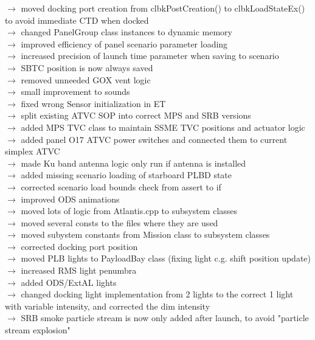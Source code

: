 \documentclass[Space_Shuttle_Vessel_Manual.tex]{subfiles}
\begin{document}
$\rightarrow$ moved docking port creation from clbkPostCreation() to clbkLoadStateEx() to avoid immediate CTD when docked\\
$\rightarrow$ changed PanelGroup class instances to dynamic memory\\
$\rightarrow$ improved efficiency of panel scenario parameter loading\\
$\rightarrow$ increased precision of launch time parameter when saving to scenario\\
$\rightarrow$ SBTC position is now always saved\\
$\rightarrow$ removed unneeded GOX vent logic\\
$\rightarrow$ small improvement to sounds\\
$\rightarrow$ fixed wrong Sensor initialization in ET\\
$\rightarrow$ split existing ATVC SOP into correct MPS and SRB versions\\
$\rightarrow$ added MPS TVC class to maintain SSME TVC positions and actuator logic\\
$\rightarrow$ added panel O17 ATVC power switches and connected them to current simplex ATVC\\
$\rightarrow$ made Ku band antenna logic only run if antenna is installed\\
$\rightarrow$ added missing scenario loading of starboard PLBD state\\
$\rightarrow$ corrected scenario load bounds check from assert to if\\
$\rightarrow$ improved ODS animations\\
$\rightarrow$ moved lots of logic from Atlantis.cpp to subsystem classes\\
$\rightarrow$ moved several consts to the files where they are used\\
$\rightarrow$ moved subystem constants from Mission class to subsystem classes\\
$\rightarrow$ corrected docking port position\\
$\rightarrow$ moved PLB lights to PayloadBay class (fixing light c.g. shift position update)\\
$\rightarrow$ increased RMS light penumbra\\
$\rightarrow$ added ODS/ExtAL lights\\
$\rightarrow$ changed docking light implementation from 2 lights to the correct 1 light with variable intensity, and corrected the dim intensity\\
$\rightarrow$ SRB smoke particle stream is now only added after launch, to avoid "particle stream explosion"\\
\end{document}
